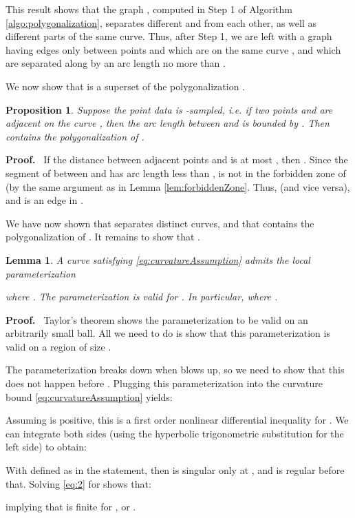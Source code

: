 \documentclass{article}
\newtheorem{proposition}[cntr]{Proposition}
\newenvironment{proof}{
  \noindent\textbf{Proof.}\ }{\hspace*{\fill}
  \medskip}
\newtheorem{lemma}[cntr]{Lemma}
\numberwithin{cntr}{section}
\numberwithin{equation}{section}
\begin{document}
This result shows that the graph , computed in Step 1 of Algorithm \ref{algo:polygonalization}, separates different  and  from each other, as well as different parts of the same curve. Thus, after Step 1, we are left with a graph  having edges only between points  and  which are on the same curve , and which are separated along  by an arc length no more than .

We now show that  is a superset of the polygonalization .

\begin{proposition}
  \label{prop:polyIncludesNeighboringPoints}
  Suppose the point data  is -sampled, i.e. if two points  and  are adjacent on the curve , then the \emph{arc length} between  and  is bounded by . Then  contains the polygonalization of .
\end{proposition}
\begin{proof}
  If the distance between adjacent points  and  is at most , then . Since the segment of  between  and  has arc length less than ,  is not in the forbidden zone of  (by the same argument as in Lemma \ref{lem:forbiddenZone}. Thus,  (and vice versa), and  is an edge in .
\end{proof}

We have now shown that  separates distinct curves, and that  contains the polygonalization  of . It remains to show that .

\begin{lemma}
  \label{lem:localGraphParameterization}
  A curve  satisfying \eqref{eq:curvatureAssumption} admits the local parameterization
  
  where . The parameterization is valid for . In particular,  where .
\end{lemma}

\begin{proof}
  Taylor's theorem shows the parameterization to be valid on an arbitrarily small ball. All we need to do is show that this parameterization is valid on a region of size .

  The parameterization breaks down when  blows up, so we need to show that this does not happen before . Plugging this parameterization into the curvature bound \eqref{eq:curvatureAssumption} yields:
  
  Assuming  is positive, this is a first order nonlinear differential inequality for . We can integrate both sides (using the hyperbolic trigonometric substitution  for the left side) to obtain:
  
  With  defined as in the statement, then  is singular only at , and is regular before that. Solving \eqref{eq:2} for  shows that:
  
  implying that  is finite for , or .
\end{proof}
\end{document}
